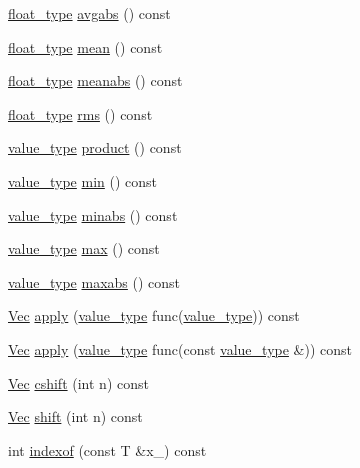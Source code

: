 \begin{DoxyCompactItemize}
\hyperlink{classtrimesh_1_1Vec_a2593716457a143008832235a3e4a9155}{float\+\_\+type} \hyperlink{classtrimesh_1_1Vec_a9d36cdd7de75f5dc18f15610f667e12a}{avgabs} () const
\item 
\hyperlink{classtrimesh_1_1Vec_a2593716457a143008832235a3e4a9155}{float\+\_\+type} \hyperlink{classtrimesh_1_1Vec_a9e94aafd3b2da3fe7006552783877c18}{mean} () const
\item 
\hyperlink{classtrimesh_1_1Vec_a2593716457a143008832235a3e4a9155}{float\+\_\+type} \hyperlink{classtrimesh_1_1Vec_ac459dca66d94b8db6dafa46dbc0f680a}{meanabs} () const
\item 
\hyperlink{classtrimesh_1_1Vec_a2593716457a143008832235a3e4a9155}{float\+\_\+type} \hyperlink{classtrimesh_1_1Vec_a83f1fd079bd1abde144fd2279d10c41b}{rms} () const
\item 
\hyperlink{classtrimesh_1_1Vec_a10a59253996e42d67c713f37592669df}{value\+\_\+type} \hyperlink{classtrimesh_1_1Vec_aafbd5627531af41c0dd50e0bccbe26d7}{product} () const
\item 
\hyperlink{classtrimesh_1_1Vec_a10a59253996e42d67c713f37592669df}{value\+\_\+type} \hyperlink{classtrimesh_1_1Vec_af1ca2c6c13e85d5b519d7cfb2d8e22d1}{min} () const
\item 
\hyperlink{classtrimesh_1_1Vec_a10a59253996e42d67c713f37592669df}{value\+\_\+type} \hyperlink{classtrimesh_1_1Vec_a4b4a9852bd70e8e90054dbf08264129e}{minabs} () const
\item 
\hyperlink{classtrimesh_1_1Vec_a10a59253996e42d67c713f37592669df}{value\+\_\+type} \hyperlink{classtrimesh_1_1Vec_ae01b6e7bf762b2f6828f838c0098024f}{max} () const
\item 
\hyperlink{classtrimesh_1_1Vec_a10a59253996e42d67c713f37592669df}{value\+\_\+type} \hyperlink{classtrimesh_1_1Vec_accc74f2ddcda684a3c2f16d11c8db490}{maxabs} () const
\item 
\hyperlink{classtrimesh_1_1Vec}{Vec} \hyperlink{classtrimesh_1_1Vec_a8081c22fb39174eb46b3cd2d012f1b39}{apply} (\hyperlink{classtrimesh_1_1Vec_a10a59253996e42d67c713f37592669df}{value\+\_\+type} func(\hyperlink{classtrimesh_1_1Vec_a10a59253996e42d67c713f37592669df}{value\+\_\+type})) const
\item 
\hyperlink{classtrimesh_1_1Vec}{Vec} \hyperlink{classtrimesh_1_1Vec_ab0c9934c8f265e9a70064eecb09b7951}{apply} (\hyperlink{classtrimesh_1_1Vec_a10a59253996e42d67c713f37592669df}{value\+\_\+type} func(const \hyperlink{classtrimesh_1_1Vec_a10a59253996e42d67c713f37592669df}{value\+\_\+type} \&)) const
\item 
\hyperlink{classtrimesh_1_1Vec}{Vec} \hyperlink{classtrimesh_1_1Vec_a1bdc9773bcfc07ee1db8aa7d6bcd35a8}{cshift} (int n) const
\item 
\hyperlink{classtrimesh_1_1Vec}{Vec} \hyperlink{classtrimesh_1_1Vec_a2faa06f21863d62c9cf3343d494d08cb}{shift} (int n) const
\item 
int \hyperlink{classtrimesh_1_1Vec_ad6a5f3d968446baa22ce76d451fb5a6a}{indexof} (const T \&x\+\_\+) const
\end{DoxyCompactItemize}
